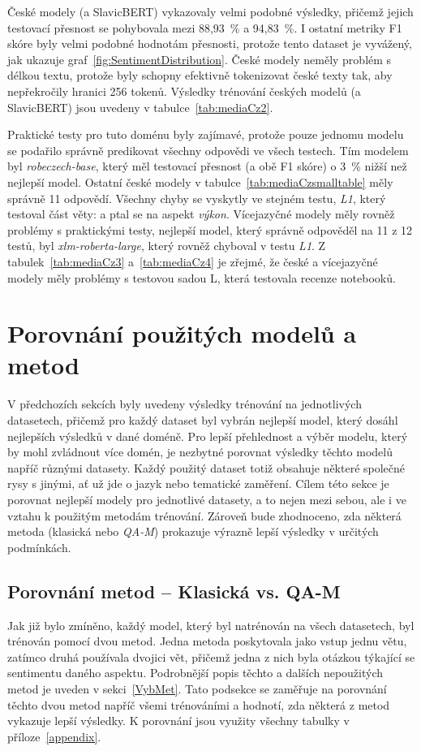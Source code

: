 České modely (a SlavicBERT) vykazovaly velmi podobné výsledky, přičemž jejich testovací přesnost se pohybovala mezi 88,93~\% a 94,83~\%. I ostatní metriky F1 skóre byly velmi podobné hodnotám přesnosti, protože tento dataset je vyvážený, jak ukazuje graf~\ref{fig:SentimentDistribution}. České modely neměly problém s délkou textu, protože byly schopny efektivně tokenizovat české texty tak, aby nepřekročily hranici 256 tokenů. Výsledky trénování českých modelů (a SlavicBERT) jsou uvedeny v tabulce~\ref{tab:mediaCz2}.

Praktické testy pro tuto doménu byly zajímavé, protože pouze jednomu modelu se podařilo správně predikovat všechny odpovědi ve všech testech. Tím modelem byl \emph{robeczech-base}, který měl testovací přesnost (a obě F1 skóre) o 3~\% nižší než nejlepší model. Ostatní české modely v tabulce~\ref{tab:mediaCzsmalltable} měly správně 11 odpovědí. Všechny chyby se vyskytly ve stejném testu, \emph{L1}, který testoval část věty:  a ptal se na aspekt \emph{výkon}. Vícejazyčné modely měly rovněž problémy s praktickými testy, nejlepší model, který správně odpověděl na 11 z 12 testů, byl \emph{xlm-roberta-large}, který rovněž chyboval v testu \emph{L1}. Z tabulek~\ref{tab:mediaCz3} a~\ref{tab:mediaCz4} je zřejmé, že české a vícejazyčné modely měly problémy s testovou sadou L, která testovala recenze notebooků.

\section{Porovnání použitých modelů a metod}  
V předchozích sekcích byly uvedeny výsledky trénování na jednotlivých datasetech, přičemž pro každý dataset byl vybrán nejlepší model, který dosáhl nejlepších výsledků v dané doméně. Pro lepší přehlednost a výběr modelu, který by mohl zvládnout více domén, je nezbytné porovnat výsledky těchto modelů napříč různými datasety. Každý použitý dataset totiž obsahuje některé společné rysy s jinými, ať už jde o jazyk nebo tematické zaměření. Cílem této sekce je porovnat nejlepší modely pro jednotlivé datasety, a to nejen mezi sebou, ale i ve vztahu k použitým metodám trénování. Zároveň bude zhodnoceno, zda některá metoda (klasická nebo \emph{QA-M}) prokazuje výrazně lepší výsledky v určitých podmínkách.

\subsection{Porovnání metod -- Klasická vs. QA-M}  
Jak již bylo zmíněno, každý model, který byl natrénován na všech datasetech, byl trénován pomocí dvou metod. Jedna metoda poskytovala jako vstup jednu větu, zatímco druhá používala dvojici vět, přičemž jedna z nich byla otázkou týkající se sentimentu daného aspektu. Podrobnější popis těchto a dalších nepoužitých metod je uveden v sekci~\ref{VybMet}. Tato podsekce se zaměřuje na porovnání těchto dvou metod napříč všemi trénováními a hodnotí, zda některá z metod vykazuje lepší výsledky. K porovnání jsou využity všechny tabulky v příloze~\ref{appendix}.

